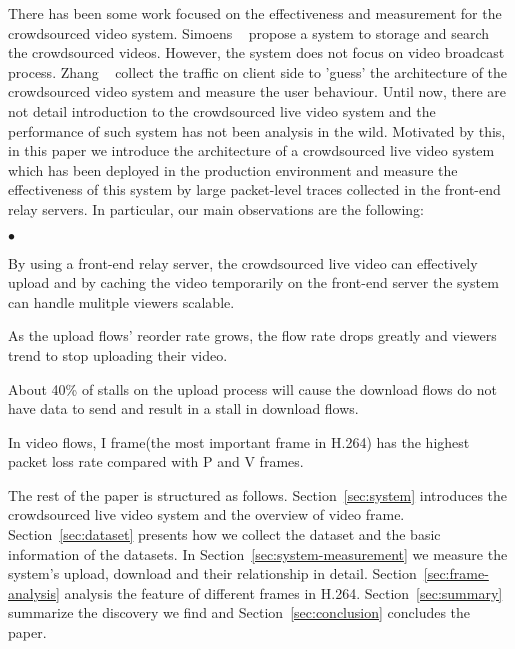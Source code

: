 There has been some work focused on the effectiveness and measurement for the crowdsourced video system. Simoens \etal~\cite{simoens2013sigasight} propose a system to storage and search the crowdsourced videos. However, the system does not focus on video broadcast process. Zhang \etal~\cite{zhang2015twitch} collect the traffic on client side to 'guess' the architecture of the crowdsourced video system and measure the user behaviour. Until now, there are not detail introduction to the crowdsourced live video system and the performance of such system has not been analysis in the wild. Motivated by this, in this paper we introduce the architecture of a crowdsourced live video system which has been deployed in the production environment and measure the effectiveness of this system by large packet-level traces collected in the front-end relay servers. In particular, our main observations are the following:

\newcommand{\squishlist}{
 \begin{list}{$\bullet$}
  { \setlength{\itemsep}{0pt}
     \setlength{\parsep}{3pt}
     \setlength{\topsep}{3pt}
     \setlength{\partopsep}{0pt}
     \setlength{\leftmargin}{1.5em}
     \setlength{\labelwidth}{1em}
     \setlength{\labelsep}{0.5em} } }

\newcommand{\squishend}{
  \end{list}  }

\squishlist
\item By using a front-end relay server, the crowdsourced live video can effectively upload and by caching the video temporarily on the front-end server the system can handle mulitple viewers scalable.

\item As the upload flows'  reorder rate grows, the flow rate drops greatly and viewers trend to stop uploading their video.

\item About 40\% of stalls on the upload process will cause the download flows do not have data to send and result in a stall in download flows.

\item In video flows, I frame(the most important frame in H.264) has the highest packet loss rate compared with P and V frames.
    
\squishend 

The rest of the paper is structured as follows. Section~\ref{sec:system} introduces the crowdsourced live video system and the overview of video frame. Section~\ref{sec:dataset} presents how we collect the dataset and the basic information of the datasets. In Section~\ref{sec:system-measurement} we measure the system's upload, download and their relationship in detail. Section~\ref{sec:frame-analysis} analysis the feature of different frames in H.264. Section~\ref{sec:summary} summarize the discovery we find and Section~\ref{sec:conclusion} concludes the paper. 